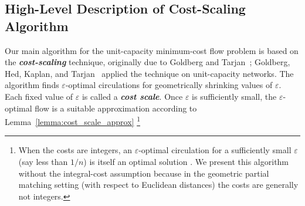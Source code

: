 \documentclass[a4paper,UKenglish]{socg-lipics-v2018}
\def\eps{\varepsilon}
\theoremstyle{plain}
\numberwithin{figure}{section}
\def\EMPH#1{\textbf{\emph{\boldmath #1}}}
\begin{document}
\subsection{High-Level Description of Cost-Scaling Algorithm}

Our main algorithm for the unit-capacity minimum-cost flow problem is based on the \EMPH{cost-scaling} technique,
originally due to Goldberg and
Tarjan~\cite{GT90}; Goldberg, Hed, Kaplan, and Tarjan~\cite{GHKT17} applied the technique on unit-capacity networks.
%
The algorithm finds $\eps$-optimal circulations for geometrically shrinking
values of $\eps$.
Each fixed value of $\eps$ is called a
\EMPH{cost scale}.
Once $\eps$ is sufficiently small, the $\eps$-optimal flow is a suitable
approximation according to Lemma~\ref{lemma:cost_scale_approx}%
\footnote{When the costs are integers, an $\eps$-optimal circulation for a sufficiently small $\eps$ (say less than $1/n$) is itself an optimal solution \cite{GT90,GHKT17}.
We present this algorithm without the integral-cost assumption because in the geometric
partial matching setting (with respect to Euclidean distances) the costs are generally not integers.}

%
\end{document}
